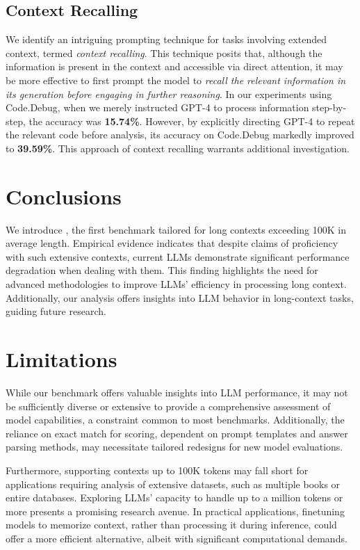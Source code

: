 \subsection{Context Recalling}
\label{sec:pipeline-instruction}

We identify an intriguing prompting technique for tasks involving extended context, termed \textit{context recalling}. This technique posits that, although the information is present in the context and accessible via direct attention, it may be more effective to first prompt the model to \textit{recall the relevant information in its generation before engaging in further reasoning}. In our experiments using Code.Debug, when we merely instructed GPT-4 to process information step-by-step, the accuracy was \textbf{15.74\%}. However, by explicitly directing GPT-4 to repeat the relevant code before analysis, its accuracy on Code.Debug markedly improved to \textbf{39.59\%}. This approach of context recalling warrants additional investigation.

\section{Conclusions}

We introduce \OURS, the first benchmark tailored for long contexts exceeding 100K in average length. Empirical evidence indicates that despite claims of proficiency with such extensive contexts, current LLMs demonstrate significant performance degradation when dealing with them. This finding highlights the need for advanced methodologies to improve LLMs' efficiency in processing long context. Additionally, our analysis offers insights into LLM behavior in long-context tasks, guiding future research.

\newpage

\section*{Limitations}

While our benchmark offers valuable insights into LLM performance, it may not be sufficiently diverse or extensive to provide a comprehensive assessment of model capabilities, a constraint common to most benchmarks. Additionally, the reliance on exact match for scoring, dependent on prompt templates and answer parsing methods, may necessitate tailored redesigns for new model evaluations.

Furthermore, supporting contexts up to 100K tokens may fall short for applications requiring analysis of extensive datasets, such as multiple books or entire databases. Exploring LLMs' capacity to handle up to a million tokens or more presents a promising research avenue. In practical applications, finetuning models to memorize context, rather than processing it during inference, could offer a more efficient alternative, albeit with significant computational demands.

